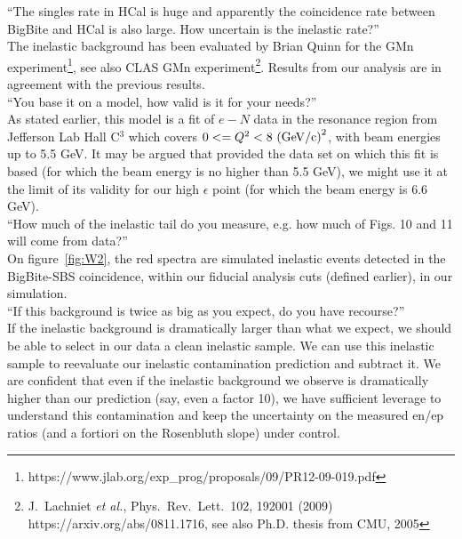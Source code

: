 \documentclass[11pt]{article}
\begin{document}
``The singles rate in HCal is huge and apparently the coincidence rate between BigBite and HCal is also large. How uncertain is the inelastic rate?''\\


The inelastic background has been evaluated by Brian Quinn for the GMn experiment\footnote{https://www.jlab.org/exp\_prog/proposals/09/PR12-09-019.pdf}, see also CLAS GMn experiment\footnote{J.~Lachniet {\it et al.}, Phys.~Rev.~Lett.~102, 192001 (2009) https://arxiv.org/abs/0811.1716, see also Ph.D. thesis from CMU, 2005}.
Results from our analysis are in agreement with the previous results.\\


``You base it on a model, how valid is it for your needs?''\\

As stated earlier, this model is a fit of $e-N$ data in the resonance region from Jefferson Lab Hall C$^{3}$ which covers $0<=Q^2<8~{\rm (GeV/c)}^2$, with beam energies up to 5.5 GeV. 
It may be argued that provided the data set on which this fit is based (for which
the beam energy is no higher than 5.5 GeV),
we might use it at the limit of its validity for our high $\epsilon$ point (for which
the beam energy is 6.6 GeV).\\

``How much of the inelastic tail do you measure, e.g. how much of Figs. 10 and 11 will come from data?''\\

On figure~\ref{fig:W2}, %
the red spectra are simulated inelastic events detected in the BigBite-SBS coincidence, within our fiducial analysis cuts (defined earlier), in our simulation.\\

``If this background is twice as big as you expect, do you have recourse?''\\

If the inelastic background is dramatically larger than what we expect, we should be able to select in our data a clean inelastic sample.
We can use this inelastic sample to reevaluate our inelastic contamination prediction and subtract it.%
We are confident that even if the inelastic background we observe is
dramatically higher than our prediction (say, even a factor 10), we have sufficient
leverage to understand this contamination and keep the uncertainty on the measured
en/ep ratios (and a fortiori on the Rosenbluth slope) under control.\\
\end{document}
